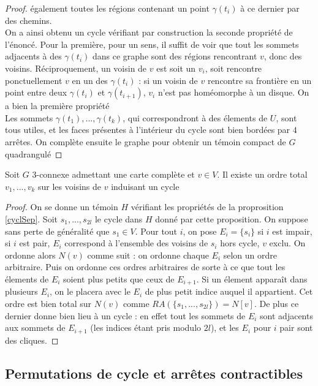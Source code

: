 \documentclass{scrartcl}
\begin{document}
\begin{flushleft}
\begin{proof}
    également toutes les régions contenant un point $\gamma(t_i)$ à ce dernier par des chemins.\\
    On a ainsi obtenu un cycle vérifiant par construction la seconde propriété de l'énoncé. Pour la première, pour un sens,
    il suffit de voir que tout les sommets adjacents à des $\gamma(t_i)$ dans ce graphe sont des régions rencontrant $v$, donc des
    voisins. Réciproquement, un voisin de $v$ est soit un $v_i$, soit rencontre ponctuellement $v$ en un des $\gamma(t_i)$ : si un
    voisin de $v$ rencontre sa frontière en un point entre deux $\gamma(t_i)$ et $\gamma(t_{i+1})$, $v_i$ n'est pas homéomorphe à
    un disque. On a bien la première propriété\\
    Les sommets $\gamma(t_1), ..., \gamma(t_k)$, qui correspondront à des élements de $U$, sont tous utiles,
    et les faces présentes à l'intérieur du cycle sont bien bordées par $4$ arrêtes. On complète ensuite le graphe pour obtenir un
    témoin compact de $G$ quadrangulé
\end{proof}

\begin{cor}\label{ordCycl}
    Soit $G$ $3$-connexe admettant une carte complète et $v \in V$. Il existe un ordre total $v_1, ..., v_k$ sur les voisins de $v$
    induisant un cycle
\end{cor}

\begin{proof}
    On se donne un témoin $H$ vérifiant les propriétés de la proprosition \ref{cyclSep}. Soit $s_1, ..., s_{2l}$ le cycle dans $H$
    donné par cette proposition. On suppose sans perte de généralité que $s_1 \in V$. Pour tout $i$, on pose $E_i = \{s_i\}$
    si $i$ est impair, si $i$ est pair, $E_i$ correspond à l'ensemble des voisins de $s_i$ hors cycle, $v$ exclu. On ordonne alors $N(v)$
    comme suit : on ordonne chaque $E_i$ selon un ordre arbitraire. Puis on ordonne ces ordres arbitraires de sorte à ce que
    tout les élements de $E_i$ soient plus petits que ceux de $E_{i+1}$. Si un élement apparaît dans plusieurs $E_i$, on le placera avec
    le $E_i$ de plus petit indice auquel il appartient. Cet ordre est bien total sur $N(v)$
    comme $RA(\{s_1, ..., s_{2l}\}) = N[v]$. De plus ce dernier donne bien lieu à un cycle : en effet tout les sommets de $E_i$ sont
    adjacents aux sommets de $E_{i+1}$ (les indices étant pris modulo $2l$), et les $E_i$ pour $i$ pair sont des cliques.
\end{proof}

\subsection{Permutations de cycle et arrêtes contractibles}


\end{flushleft}
\end{document}
